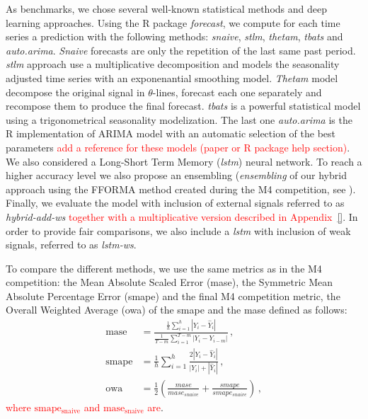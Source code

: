 \documentclass[letterpaper]{article} %
\begin{document}
As benchmarks, we chose several well-known statistical methods and deep learning approaches. Using the R package {\em forecast}, we compute for each time series a prediction with the following methods: \textit{snaive}, \textit{stlm}, \textit{thetam}, \textit{tbats} and \textit{auto.arima}. \textit{Snaive} forecasts are only the repetition of the last same past period. \textit{stlm} approach use a multiplicative decomposition and models the seasonality adjusted time series with an exponenantial smoothing model. \textit{Thetam} model decompose the original signal in $\theta$-lines, forecast each one separately and recompose them to produce the final forecast. \textit{tbats} is a powerful statistical model using a trigonometrical seasonality modelization. The last one \textit{auto.arima} is the R implementation of ARIMA model with an automatic selection of the best parameters \textcolor{red}{add a reference for these models (paper or R package help section)}. We also considered a Long-Short Term Memory (\textit{lstm}) neural network. %
To reach a higher accuracy level we also propose an ensembling (\textit{ensembling} of our hybrid approach using the FFORMA method created during the M4 competition, see \citep{fforma}). 
Finally, we evaluate the model with  inclusion of external signals referred to as \textit{hybrid-add-ws} \textcolor{red}{together with a multiplicative version described in Appendix~\ref{}}. In order to provide fair comparisons, we also include a \textit{lstm} with inclusion of weak signals, referred to as \textit{lstm-ws}.


To compare the different methods, we use the same metrics as in the M4 competition: the Mean Absolute Scaled Error (mase), the Symmetric Mean Absolute Percentage Error (smape) and the final M4 competition metric, the Overall Weighted Average (owa) of the smape and the mase defined as follows:
\begin{align*}
\mathrm{mase} &= \frac{\frac{1}{h}\sum_{i=1}^h |Y_i - \hat{Y}_i| }{\frac{1}{T-m}\sum_{i=1}^{T-m} |Y_i - Y_{i-m}|}\,,\\
\mathrm{smape} &= \frac{1}{h} \sum_{i=1}^h \frac{2|Y_i - \hat{Y}_i|}{|Y_i| + |\hat{Y}_i|}\,,\\
\mathrm{owa} &= \frac{1}{2}(\frac{mase}{mase_{snaive}} + \frac{smape}{smape_{snaive}})\,,
\end{align*}
\textcolor{red}{where $\mathrm{smape_{snaive}}$ and $\mathrm{mase_{snaive}}$ are}.
\end{document}
